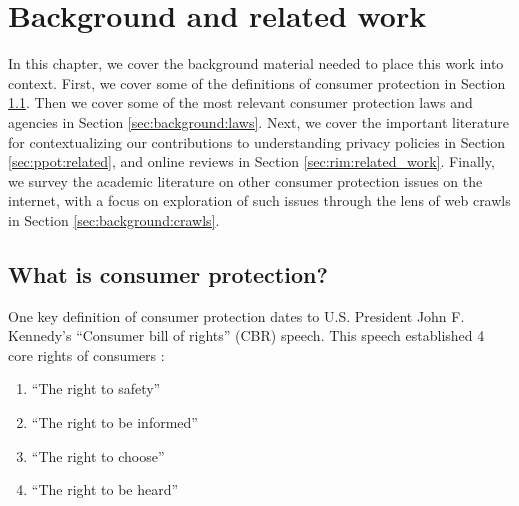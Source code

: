 \chapter{Background and related work} \label{ch:background}

In this chapter, we cover the background material needed to place this work into context. First, we cover some of the definitions of consumer protection in Section \ref{sec:background:definition}. Then we cover some of the most relevant consumer protection laws and agencies in Section \ref{sec:background:laws}. Next, we cover the important literature for contextualizing our contributions to understanding privacy policies in Section \ref{sec:ppot:related}, and online reviews in Section \ref{sec:rim:related_work}. Finally, we survey the academic literature on other consumer protection issues on the internet, with a focus on exploration of such issues through the lens of web crawls in Section \ref{sec:background:crawls}.

\section{What is consumer protection?} \label{sec:background:definition}

One key definition of consumer protection dates to U.S. President John F. Kennedy's ``Consumer bill of rights'' (CBR) speech. This speech established 4 core rights of consumers \cite{kennedy1962special}:
\begin{enumerate}
\item ``The right to safety''
\item ``The right to be informed''
\item ``The right to choose''
\item ``The right to be heard''
\end{enumerate}

